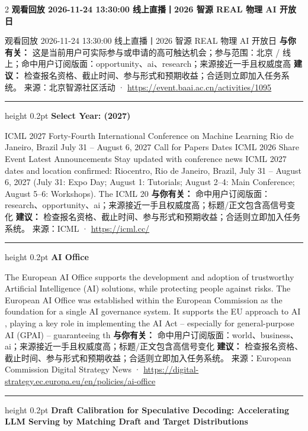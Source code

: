 \documentclass[10.5pt]{ctexart}
\begin{document}
\begin{multicols}{2}
{\large\bfseries 观看回放 2026-11-24 13:30:00 线上直播丨2026 智源 REAL 物理 AI 开放日}\par
观看回放 2026-11-24 13:30:00 线上直播丨2026 智源 REAL 物理 AI 开放日
\textbf{与你有关：} 这是当前用户可实际参与或申请的高可触达机会；参与范围：北京 / 线上；命中用户订阅版面：opportunity、ai、research；来源接近一手且权威度高
\textbf{建议：} 检查报名资格、截止时间、参与形式和预期收益；合适则立即加入任务系统。
{\footnotesize\color{ormuted} 来源：北京智源社区活动 · \url{https://event.baai.ac.cn/activities/1095}}
\vspace{2mm}
\hrule height 0.2pt
\vspace{2mm}
{\large\bfseries Select Year: (2027)}\par
ICML 2027 Forty-Fourth International Conference on Machine Learning Rio de Janeiro, Brazil July 31 – August 6, 2027 Call for Papers Dates ICML 2026 Share Event Latest Announcements Stay updated with conference news ICML 2027 dates and location confirmed: Riocentro, Rio de Janeiro, Brazil, July 31 – August 6, 2027 (July 31: Expo Day; August 1: Tutorials; August 2–4: Main Conference; August 5–6: Workshops). The ICML 20
\textbf{与你有关：} 命中用户订阅版面：research、opportunity、ai；来源接近一手且权威度高；标题/正文包含高信号变化
\textbf{建议：} 检查报名资格、截止时间、参与形式和预期收益；合适则立即加入任务系统。
{\footnotesize\color{ormuted} 来源：ICML · \url{https://icml.cc/}}
\vspace{2mm}
\hrule height 0.2pt
\vspace{2mm}
{\large\bfseries AI Office}\par
The European AI Office supports the development and adoption of trustworthy Artificial Intelligence (AI) solutions, while protecting people against risks. The European AI Office was established within the European Commission as the foundation for a single AI governance system. It supports the EU approach to AI , playing a key role in implementing the AI Act – especially for general-purpose AI (GPAI) – guaranteeing th
\textbf{与你有关：} 命中用户订阅版面：world、business、ai；来源接近一手且权威度高；标题/正文包含高信号变化
\textbf{建议：} 检查报名资格、截止时间、参与形式和预期收益；合适则立即加入任务系统。
{\footnotesize\color{ormuted} 来源：European Commission Digital Strategy News · \url{https://digital-strategy.ec.europa.eu/en/policies/ai-office}}
\vspace{2mm}
\hrule height 0.2pt
\vspace{2mm}
{\large\bfseries Draft Calibration for Speculative Decoding: Accelerating LLM Serving by Matching Draft and Target Distributions}\par

\end{multicols}
\end{document}
